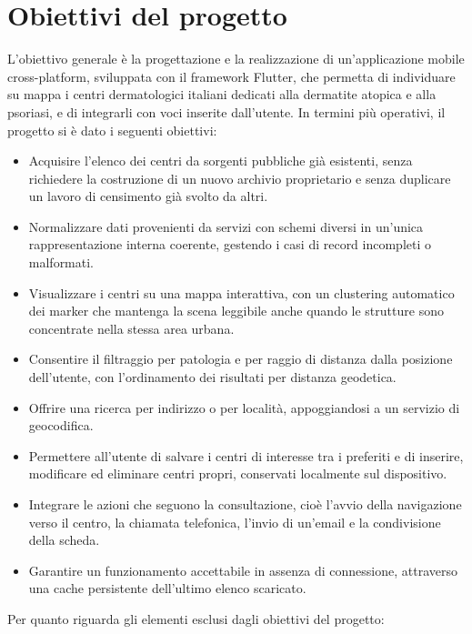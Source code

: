 \section{Obiettivi del progetto}\label{sec:obiettivi-progetto}

L'obiettivo generale è la progettazione e la realizzazione di un'applicazione mobile cross-platform, sviluppata con il
framework Flutter, che permetta di individuare su mappa i centri dermatologici italiani dedicati alla dermatite atopica
e alla psoriasi, e di integrarli con voci inserite dall'utente.
In termini più operativi, il progetto si è dato i seguenti obiettivi:

\begin{itemize}[itemsep=2pt]
  \item Acquisire l'elenco dei centri da sorgenti pubbliche già esistenti, senza richiedere la costruzione di un nuovo archivio
  proprietario e senza duplicare un lavoro di censimento già svolto da altri.
  \item Normalizzare dati provenienti da servizi con schemi diversi in un'unica rappresentazione interna coerente, gestendo
  i casi di record incompleti o malformati.
  \item Visualizzare i centri su una mappa interattiva, con un clustering automatico dei marker che mantenga la scena
  leggibile anche quando le strutture sono concentrate nella stessa area urbana.
  \item Consentire il filtraggio per patologia e per raggio di distanza dalla posizione dell'utente, con l'ordinamento dei
  risultati per distanza geodetica.
  \item Offrire una ricerca per indirizzo o per località, appoggiandosi a un servizio di geocodifica.
  \item Permettere all'utente di salvare i centri di interesse tra i preferiti e di inserire, modificare ed eliminare centri propri,
  conservati localmente sul dispositivo.
  \item Integrare le azioni che seguono la consultazione, cioè l'avvio della navigazione verso il centro, la chiamata telefonica,
  l'invio di un'email e la condivisione della scheda.
  \item Garantire un funzionamento accettabile in assenza di connessione, attraverso una cache persistente dell'ultimo elenco scaricato.
\end{itemize}

Per quanto riguarda gli elementi esclusi dagli obiettivi del progetto: %


